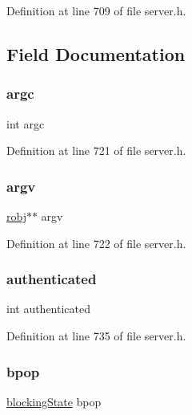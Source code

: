 Definition at line 709 of file server.\+h.



\subsection{Field Documentation}
\mbox{\label{structclient_ad1447518f4372828b8435ae82e48499e}} 
\subsubsection{\texorpdfstring{argc}{argc}}
{\footnotesize\ttfamily int argc}



Definition at line 721 of file server.\+h.

\mbox{\label{structclient_a5c75dd3cb8eb8a3f5be7d4fdf48a9ef9}} 
\subsubsection{\texorpdfstring{argv}{argv}}
{\footnotesize\ttfamily \hyperlink{server_8h_a540f174d2685422fbd7d12e3cd44c8e2}{robj}$\ast$$\ast$ argv}



Definition at line 722 of file server.\+h.

\mbox{\label{structclient_a29e86d0f6d62ef1edac10a46e4c92095}} 
\subsubsection{\texorpdfstring{authenticated}{authenticated}}
{\footnotesize\ttfamily int authenticated}



Definition at line 735 of file server.\+h.

\mbox{\label{structclient_ade2d291613f86ad81abd9b32a331c97d}} 
\subsubsection{\texorpdfstring{bpop}{bpop}}
{\footnotesize\ttfamily \hyperlink{structblocking_state}{blocking\+State} bpop}



